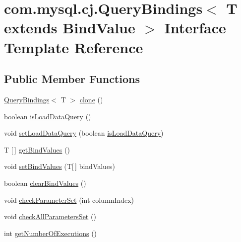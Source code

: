 \hypertarget{interfacecom_1_1mysql_1_1cj_1_1_query_bindings}{}\section{com.\+mysql.\+cj.\+Query\+Bindings$<$ T extends Bind\+Value $>$ Interface Template Reference}
\label{interfacecom_1_1mysql_1_1cj_1_1_query_bindings}
\subsection*{Public Member Functions}
\begin{DoxyCompactItemize}
\item 
\mbox{\hyperlink{interfacecom_1_1mysql_1_1cj_1_1_query_bindings}{Query\+Bindings}}$<$ T $>$ \mbox{\hyperlink{interfacecom_1_1mysql_1_1cj_1_1_query_bindings_af95c1b74f5f636e02f47609fdbd58b05}{clone}} ()
\item 
boolean \mbox{\hyperlink{interfacecom_1_1mysql_1_1cj_1_1_query_bindings_ae5c18c83c443b8f2372d4ef2c436ebfa}{is\+Load\+Data\+Query}} ()
\item 
void \mbox{\hyperlink{interfacecom_1_1mysql_1_1cj_1_1_query_bindings_a89ba1ff9afcf80a0709f2dd28b8baf53}{set\+Load\+Data\+Query}} (boolean \mbox{\hyperlink{interfacecom_1_1mysql_1_1cj_1_1_query_bindings_ae5c18c83c443b8f2372d4ef2c436ebfa}{is\+Load\+Data\+Query}})
\item 
T \mbox{[}$\,$\mbox{]} \mbox{\hyperlink{interfacecom_1_1mysql_1_1cj_1_1_query_bindings_a7b42c528b1aa6e6223f34fbe70a331ef}{get\+Bind\+Values}} ()
\item 
void \mbox{\hyperlink{interfacecom_1_1mysql_1_1cj_1_1_query_bindings_a1311e39a424947e23b0230c23402f788}{set\+Bind\+Values}} (T\mbox{[}$\,$\mbox{]} bind\+Values)
\item 
boolean \mbox{\hyperlink{interfacecom_1_1mysql_1_1cj_1_1_query_bindings_acd90572938fcce89fe68b9a3ba120372}{clear\+Bind\+Values}} ()
\item 
void \mbox{\hyperlink{interfacecom_1_1mysql_1_1cj_1_1_query_bindings_a4413f6fc0016f5a9d571bb7e3460a974}{check\+Parameter\+Set}} (int column\+Index)
\item 
void \mbox{\hyperlink{interfacecom_1_1mysql_1_1cj_1_1_query_bindings_a2c3998f19786a54dec34368742733a61}{check\+All\+Parameters\+Set}} ()
\item 
int \mbox{\hyperlink{interfacecom_1_1mysql_1_1cj_1_1_query_bindings_ab38a3623bb4f63d453218f47a2b8399e}{get\+Number\+Of\+Executions}} ()

\end{DoxyCompactItemize}
